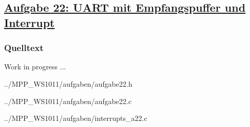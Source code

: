 \subsection
{\href{http://cst.mi.fu-berlin.de/intern/19606-P-MPP/Aufgaben/040703.html}
{Aufgabe 22: UART mit Empfangspuffer und Interrupt}}

\subsubsection*{Quelltext}

Work in progress ...


{../MPP_WS1011/aufgaben/aufgabe22.h}


{../MPP_WS1011/aufgaben/aufgabe22.c}


{../MPP_WS1011/aufgaben/interrupts_a22.c}
